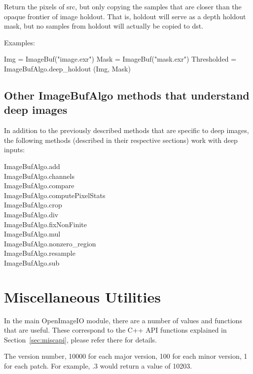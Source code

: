 Return the pixels of {\cf src}, but only copying the
samples that are closer than the opaque frontier of image {\cf holdout}.
That is, {\cf holdout} will serve as a depth holdout mask, but no samples
from {\cf holdout} will actually be copied to {\cf dst}.

\smallskip
\noindent Examples:
\begin{code}
    Img = ImageBuf("image.exr")
    Mask = ImageBuf("mask.exr")
    Thresholded = ImageBufAlgo.deep_holdout (Img, Mask)
\end{code}
\apiend


\subsection*{Other ImageBufAlgo methods that understand deep images}

In addition to the previously described methods that are specific to
deep images, the following \ImageBufAlgo methods (described in their
respective sections) work with deep inputs:

\medskip

\noindent
{\cf ImageBufAlgo.add} \\
{\cf ImageBufAlgo.channels} \\
{\cf ImageBufAlgo.compare} \\
{\cf ImageBufAlgo.computePixelStats} \\
{\cf ImageBufAlgo.crop} \\
{\cf ImageBufAlgo.div} \\
{\cf ImageBufAlgo.fixNonFinite} \\
{\cf ImageBufAlgo.mul} \\
{\cf ImageBufAlgo.nonzero_region} \\
{\cf ImageBufAlgo.resample} \\
{\cf ImageBufAlgo.sub} \\


\newpage
\section{Miscellaneous Utilities}
\label{sec:pythonmiscapi}

In the main {\cf OpenImageIO} module, there are a number of values and
functions that are useful.  These correspond to the C++ API functions
explained in Section~\ref{sec:miscapi}, please refer there for details.

The \product version number, 10000 for each
major version, 100 for each minor version, 1 for each patch.  For
example, .3 would return a value of 10203.
\apiend

